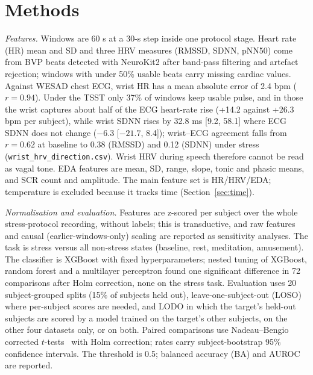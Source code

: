 \documentclass[journal]{IEEEtran}
\begin{document}
\section{Methods}
\emph{Features.} Windows are 60 s at a 30-s step inside one protocol stage. Heart rate (HR) mean and SD and three HRV measures (RMSSD, SDNN, pNN50) come from BVP beats detected with NeuroKit2 after band-pass filtering and artefact rejection; windows with under 50\% usable beats carry missing cardiac values. Against WESAD chest ECG, wrist HR has a mean absolute error of 2.4 bpm ($r=0.94$). Under the TSST only 37\% of windows keep usable pulse, and in those the wrist captures about half of the ECG heart-rate rise (+14.2 against +26.3 bpm per subject), while wrist SDNN rises by 32.8 ms [9.2, 58.1] where ECG SDNN does not change ($-6.3$ [$-21.7$, 8.4]); wrist--ECG agreement falls from $r=0.62$ at baseline to 0.38 (RMSSD) and 0.12 (SDNN) under stress (\texttt{wrist\_hrv\_direction.csv}). Wrist HRV during speech therefore cannot be read as vagal tone. EDA features are mean, SD, range, slope, tonic and phasic means, and SCR count and amplitude. The main feature set is HR/HRV/EDA; temperature is excluded because it tracks time (Section~\ref{sec:time}).

\emph{Normalisation and evaluation.} Features are z-scored per subject over the whole stress-protocol recording, without labels; this is transductive, and raw features and causal (earlier-windows-only) scaling are reported as sensitivity analyses. The task is stress versus all non-stress states (baseline, rest, meditation, amusement). The classifier is XGBoost with fixed hyperparameters; nested tuning of XGBoost, random forest and a multilayer perceptron found one significant difference in 72 comparisons after Holm correction, none on the stress task. Evaluation uses 20 subject-grouped splits (15\% of subjects held out), leave-one-subject-out (LOSO) where per-subject scores are needed, and LODO in which the target's held-out subjects are scored by a model trained on the target's other subjects, on the other four datasets only, or on both. Paired comparisons use Nadeau--Bengio corrected $t$-tests~\cite{nadeau2003} with Holm correction; rates carry subject-bootstrap 95\% confidence intervals. The threshold is 0.5; balanced accuracy (BA) and AUROC are reported.
\end{document}
